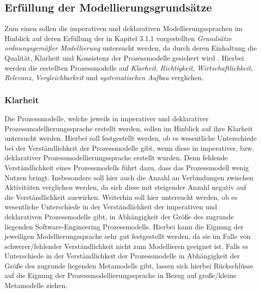 \subsection{Erfüllung der Modellierungsgrundsätze}
Zum einen sollen die imperativen und deklarativen Modellierungssprachen im Hinblick auf deren Erfüllung der in Kapitel 3.1.1 vorgestellten \textit{Grundsätze ordnungsgemäßer Modellierung} untersucht werden, da durch deren Einhaltung die Qualität, Klarheit und Konsistenz der Prozessmodelle gesichert wird \cite{freund2007}. Hierbei werden die erstellten Prozessmodelle auf \textit{Klarheit}, \textit{Richtigkeit}, \textit{Wirtschaftlichkeit}, \textit{Relevanz}, \textit{Vergleichbarkeit} und \textit{systematischen Aufbau} verglichen.

\subsubsection{Klarheit}
Die Prozessmodelle, welche jeweils in imperativer und deklarativer Prozessmodellierungssprache erstellt werden, sollen im Hinblick auf ihre Klarheit untersucht werden. Hierbei soll festgestellt werden, ob es wesentliche Unterschiede bei der Verständlichkeit der Prozessmodelle gibt, wenn diese in imperativer, bzw. deklarativer Prozessmodellierungssprache erstellt wurden. Denn fehlende Verständlichkeit eines Prozessmodells führt dazu, dass das Prozessmodell wenig Nutzen bringt. Insbesondere soll hier auch die Anzahl an Verbindungen zwischen Aktivitäten verglichen werden, da sich diese mit steigender Anzahl negativ auf die Verständlichkeit auswirken.\newline
Weiterhin soll hier untersucht werden, ob es wesentliche Unterschiede in der Verständlichkeit der imperativen und deklarativen Prozessmodelle gibt, in Abhängigkeit der Größe des zugrunde liegenden Software-Engineering Prozessmodells. Hierbei kann die Eignung der jeweiligen Modellierungssprache sehr gut festgestellt werden, da sie im Falle von schwerer/fehlender Verständlichkeit nicht zum Modellieren geeignet ist. Falls es Unterschiede in der Verständlichkeit der Prozessmodelle in Abhängigkeit der Größe des zugrunde liegenden Metamodells gibt, lassen sich hierbei Rückschlüsse auf die Eignung der Prozessmodellierungssprache in Bezug auf große/kleine Metamodelle ziehen.

